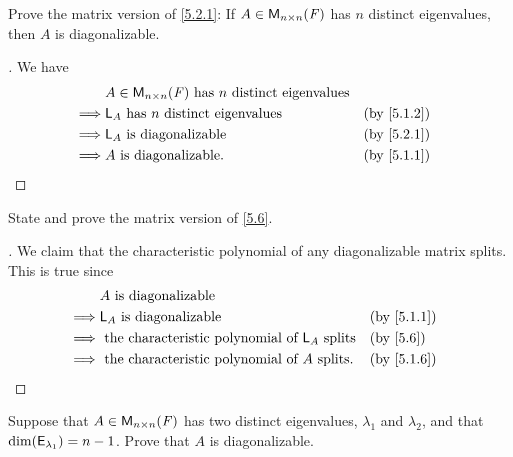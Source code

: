 \exercisesection

\setcounter{ex}{3}
\begin{ex}\label{ex:5.2.4}
  Prove the matrix version of \cref{5.2.1}:
  If \(A \in \ms[n][n][\F]\) has \(n\) distinct eigenvalues, then \(A\) is diagonalizable.
\end{ex}

\begin{proof}[]
  We have
  \begin{align*}
             & A \in \ms[n][n][\F] \text{ has } n \text{ distinct  eigenvalues}                 \\
    \implies & \L_A \text{ has } n \text{ distinct  eigenvalues}                &  & \by{5.1.2} \\
    \implies & \L_A \text{ is diagonalizable}                                   &  & \by{5.2.1} \\
    \implies & A \text{ is diagonalizable}.                                     &  & \by{5.1.1}
  \end{align*}
\end{proof}

\begin{ex}\label{ex:5.2.5}
  State and prove the matrix version of \cref{5.6}.
\end{ex}

\begin{proof}[]
  We claim that the characteristic polynomial of any diagonalizable matrix splits.
  This is true since
  \begin{align*}
             & A \text{ is diagonalizable}                                                   \\
    \implies & \L_A \text{ is diagonalizable}                                &  & \by{5.1.1} \\
    \implies & \text{ the characteristic polynomial of } \L_A \text{ splits} &  & \by{5.6}   \\
    \implies & \text{ the characteristic polynomial of } A \text{ splits}.   &  & \by{5.1.6}
  \end{align*}
\end{proof}

\setcounter{ex}{7}
\begin{ex}\label{ex:5.2.8}
  Suppose that \(A \in \ms[n][n][\F]\) has two distinct eigenvalues, \(\lambda_1\) and \(\lambda_2\), and that \(\dim(\mathsf{E}_{\lambda_1}) = n - 1\).
  Prove that \(A\) is diagonalizable.
\end{ex}

